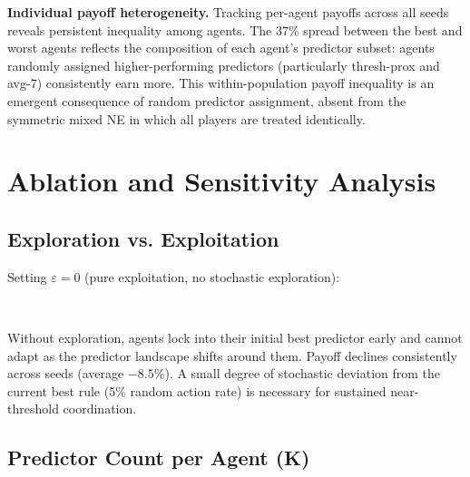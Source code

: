 \documentclass[letterpaper]{article}
\begin{document}
\textbf{Individual payoff heterogeneity.} Tracking per-agent payoffs across all seeds reveals persistent inequality among agents. The 37\% spread between the best and worst agents reflects the composition of each agent's predictor subset: agents randomly assigned higher-performing predictors (particularly thresh-prox and avg-7) consistently earn more. This within-population payoff inequality is an emergent consequence of random predictor assignment, absent from the symmetric mixed NE in which all players are treated identically. \\

\section{Ablation and Sensitivity Analysis}

\subsection{Exploration vs. Exploitation}

Setting $\varepsilon = 0$ (pure exploitation, no stochastic exploration): \\

\begin{table}[H]
\centering
{} \\
\caption{Exploration vs. Exploitation}
\end{table}

Without exploration, agents lock into their initial best predictor early and cannot adapt as the predictor landscape shifts around them. Payoff declines consistently across seeds (average $-8.5\%$). A small degree of stochastic deviation from the current best rule (5\% random action rate) is necessary for sustained near-threshold coordination. \\

\subsection{Predictor Count per Agent (K)}
\end{document}
